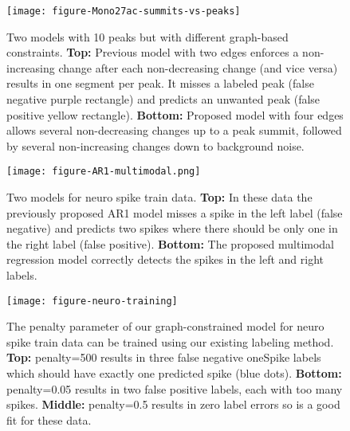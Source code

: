 \documentclass{article}
\begin{document}
\begin{figure}
  \centering
  \texttt{[image: figure-Mono27ac-summits-vs-peaks]}
  \caption{Two models with 10 peaks but with different graph-based
    constraints. \textbf{Top:} Previous model with two edges enforces
    a non-increasing change after each non-decreasing change (and vice
    versa) results in one segment per peak. It misses a labeled peak
    (false negative purple rectangle) and predicts an unwanted peak
    (false positive yellow rectangle). \textbf{Bottom:} Proposed model
    with four edges allows several non-decreasing changes up to a peak
    summit, followed by several non-increasing changes down to
    background noise.}
  \label{fig:summits-vs-peaks}
\end{figure}

\begin{figure}
  \centering
  \texttt{[image: figure-AR1-multimodal.png]}
  \caption{Two models for neuro spike train data. \textbf{Top:} In
    these data the previously proposed AR1 model misses a spike in the
    left label (false negative) and predicts two spikes where there
    should be only one in the right label (false
    positive). \textbf{Bottom:} The proposed multimodal regression
    model correctly detects the spikes in the left and right labels.}
  \label{fig:AR1-multimodal}
\end{figure}

\begin{figure}
  \centering
  \texttt{[image: figure-neuro-training]}
  \caption{The penalty parameter of our graph-constrained model for
    neuro spike train data can be trained using our existing labeling
    method. \textbf{Top:} penalty=500 results in three false negative
    oneSpike labels which should have exactly one predicted spike
    (blue dots). \textbf{Bottom:} penalty=0.05 results in two false
    positive labels, each with too many spikes. \textbf{Middle:}
    penalty=0.5 results in zero label errors so is a good fit for
    these data.}
  \label{fig:neuro-training}
\end{figure}



\end{document}
